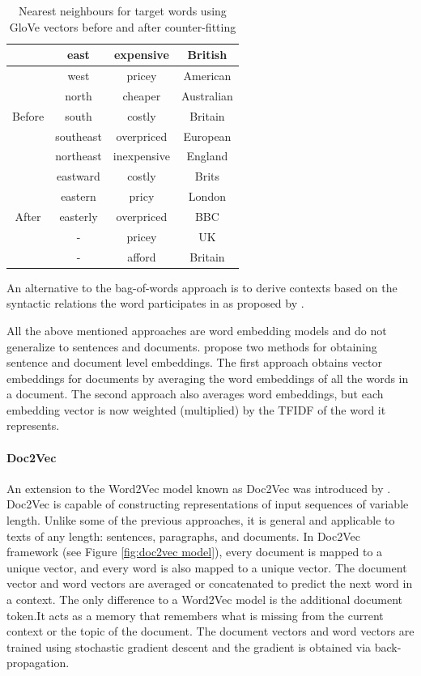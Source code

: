  \begin{table}[h]
 	\begin{center}
 		\begin{tabular}{ c c c c } 
 			\hline
 			& east & expensive & British \\
 			\hline
 			\multirow{5}{4em}{Before} &
 			
 			west & pricey &  American
 			\\ 
 			& north & cheaper & Australian\\ 
 			& south & costly & Britain\\ 
 			& southeast & overpriced & European\\
 			& northeast & inexpensive & England\\
 			\hline
 			\multirow{5}{4em}{After} & 
 			eastward & costly & Brits\\ 
 			& eastern & pricy & London\\ 
 			& easterly & overpriced & BBC\\ 
 			& - & pricey & UK\\ 
 			& - & afford & Britain\\ 
 			\hline
 		\end{tabular}
 		
 	\end{center}
 	
 	\caption{Nearest neighbours for target words using GloVe
 		vectors before and after counter-fitting} \label{tab:counter_fitting}
 \end{table}
 
 An alternative to
 the bag-of-words approach is to derive contexts
 based on the syntactic relations the word participates
 in as proposed by \cite{levy2014dependency}.

All the above mentioned approaches are word embedding models and do not generalize to sentences and documents. \cite{jsnior2017nilc} propose two methods for obtaining sentence and document level embeddings. The first approach obtains vector embeddings for documents by averaging the word embeddings of all the words in a document. The second approach also averages word embeddings, but each embedding vector is now weighted (multiplied) by the TFIDF
of the word it represents.
\paragraph{Doc2Vec} An extension to the Word2Vec model known as Doc2Vec was introduced by \cite{le2014distributed}. Doc2Vec is capable of constructing representations of input sequences of
variable length. Unlike some of the previous approaches, it is general and
applicable to texts of any length: sentences, paragraphs, and documents. In
Doc2Vec framework (see Figure \ref{fig:doc2vec model}), every document is mapped to a unique
vector, and every word is also mapped to a unique vector. The document
vector and word vectors are averaged or concatenated to predict the next
word in a context. The only difference to a Word2Vec model is the additional
document token.It acts as a memory that remembers what is missing from
the current context or the topic of the document. The document vectors and
word vectors are trained using stochastic gradient descent and the gradient
is obtained via back-propagation.

